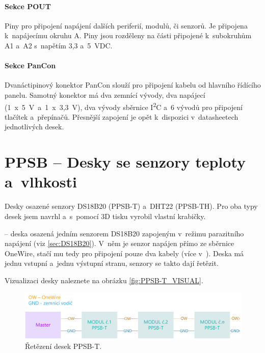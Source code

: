 \paragraph{Sekce POUT} 
Piny pro připojení napájení dalších periferií, modulů, či senzorů.
Je připojena k~napájecímu okruhu A.
Piny jsou rozděleny na části připojené k~subokruhům A1 a~A2 s~napětím 3,3 a~5~VDC.

\paragraph{Sekce PanCon}
Dvanáctipinový konektor PanCon slouží pro připojení kabelu od hlavního řídícího panelu. 
Samotný konektor má dva zemnící vývody, dva napájecí (1~x~5~V~a~1~x~3,3~V), dva vývody sběrnice I\textsuperscript{2}C a~6 vývodů pro připojení tlačítek a~přepínačů.
Přesnější zapojení je opět k~dispozici v~datasheetech jednotlivých desek.

\section{PPSB -- Desky se senzory teploty a~vlhkosti}
Desky osazené senzory DS18B20\cite{DS18B20} (PPSB-T) a~DHT22\cite{DHT22} (PPSB-TH).
Pro oba typy desek jsem navrhl a~s~pomocí 3D tisku vyrobil vlastní krabičky.\newline

\noindent{} -- deska osazená jedním senzorem DS18B20 \cite{DS18B20} zapojeným v~režimu parazitního napájení (viz \autoref{sec:DS18B20}).
V~něm je senzor napájen přímo ze sběrnice OneWire, stačí mu tedy pro připojení pouze dva kabely (více v~\cite{DS18B20}).
Deska má jednu vstupní a~jednu výstupní stranu, senzory se takto dají řetězit.

Vizualizaci desky naleznete na obrázku \ref{fig:PPSB-T_VISUAL}.\newline \newline

\begin{figure}[h]
    \centering
   \includegraphics[width=\textwidth]{img/HARDWARE/PPSB-T_CHAIN.png}
   \caption{Řetězení desek PPSB-T.}
   \label{fig:PPSB-T_wiring}
\end{figure}

